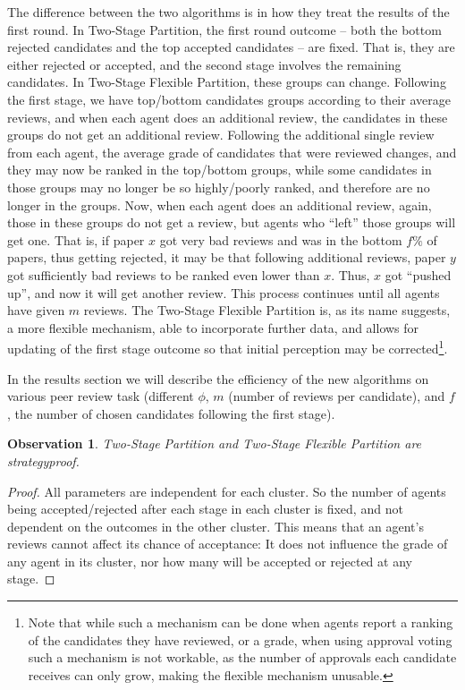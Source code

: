 \documentclass[letterpaper]{article}
\newtheorem{observation}{Observation}
\begin{document}
The difference between the two algorithms is in how they treat the results of the first round. In Two-Stage Partition, the first round outcome -- both the bottom rejected candidates and the top accepted candidates -- are fixed. That is, they are either rejected or accepted, and the second stage involves the remaining candidates. In Two-Stage Flexible Partition, these groups can change. Following the first stage, we have top/bottom candidates groups according to their average reviews, and when each agent does an additional review, the candidates in these groups do not get an additional review. Following the additional single review from each agent, the average grade of candidates that were reviewed changes, and they may now be ranked in the top/bottom groups, while some candidates in those groups may no longer be so highly/poorly ranked, and therefore are no longer in the groups. Now, when each agent does an additional review, again, those in these groups do not get a review, but agents who ``left'' those groups will get one. That is, if paper $x$ got very bad reviews and was in the bottom $f\%$ of papers, thus getting rejected, it may be that following additional reviews, paper $y$ got sufficiently bad reviews to be ranked even lower than $x$. Thus, $x$ got ``pushed up'', and now it will get another review. This process continues until all agents have given $m$ reviews.
The Two-Stage Flexible Partition is, as its name suggests, a more flexible mechanism, able to incorporate further data, and allows for updating of the first stage outcome so that initial perception may be corrected\footnote{Note that while such a mechanism can be done when agents report a ranking of the candidates they have reviewed, or a grade, when using approval voting such a mechanism is not workable, as the number of approvals each candidate receives can only grow, making the flexible mechanism unusable.}.

In the results section we will describe the efficiency of the new algorithms on various peer review task (different $\phi$, $m$ (number of reviews per candidate), and $f$, the number of chosen candidates following the first stage). %

\begin{observation}
Two-Stage Partition and Two-Stage Flexible Partition are strategyproof.
\end{observation}
\begin{proof}
All parameters are independent for each cluster. So the number of agents being accepted/rejected after each stage in each cluster is fixed, and not dependent on the outcomes in the other cluster. This means that an agent's reviews cannot affect its chance of acceptance: It does not influence the grade of any agent in its cluster, nor how many will be accepted or rejected at any stage.
\end{proof}
\end{document}
